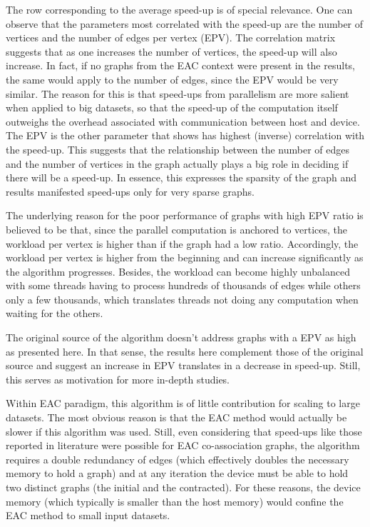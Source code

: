 

The row corresponding to the average speed-up is of special relevance.
One can observe that the parameters most correlated with the speed-up are the number of vertices and the number of edges per vertex (EPV).
The correlation matrix suggests that as one increases the number of vertices, the speed-up will also increase.
In fact, if no graphs from the EAC context were present in the results, the same would apply to the number of edges, since the EPV would be very similar.
The reason for this is that speed-ups from parallelism are more salient when applied to big datasets, so that the speed-up of the computation itself outweighs the overhead associated with communication between host and device.
The EPV is the other parameter that shows has highest (inverse) correlation with the speed-up.
This suggests that the relationship between the number of edges and the number of vertices in the graph actually plays a big role in deciding if there will be a speed-up.
In essence, this expresses the sparsity of the graph and results manifested speed-ups only for very sparse graphs.

The underlying reason for the poor performance of graphs with high EPV ratio is believed to be that, since the parallel computation is anchored to vertices, the workload per vertex is higher than if the graph had a low ratio.
Accordingly, the workload per vertex is higher from the beginning and can increase significantly as the algorithm progresses.
Besides, the workload can become highly unbalanced with some threads having to process hundreds of thousands of edges while others only a few thousands, which translates threads not doing any computation when waiting for the others.

The original source \cite{Sousa2015} of the algorithm doesn't address graphs with a EPV as high as presented here.
In that sense, the results here complement those of the original source and suggest an increase in EPV translates in a decrease in speed-up.
Still, this serves as motivation for more in-depth studies.

Within EAC paradigm, this algorithm is of little contribution for scaling to large datasets.
The most obvious reason is that the EAC method would actually be slower if this algorithm was used.
Still, even considering that speed-ups like those reported in literature were possible for EAC co-association graphs, the algorithm requires a double redundancy of edges (which effectively doubles the necessary memory to hold a graph) and at any iteration the device must be able to hold two distinct graphs (the initial and the contracted).
For these reasons, the device memory (which typically is smaller than the host memory) would confine the EAC method to small input datasets. 

